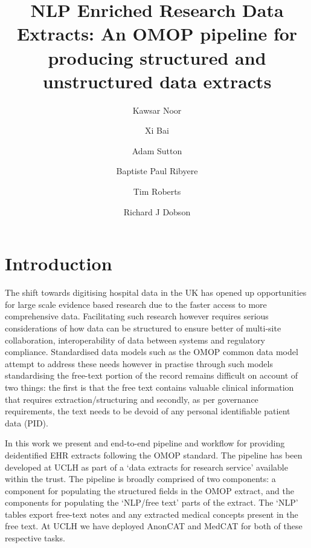 \documentclass[11pt]{article}
\title{NLP Enriched Research Data Extracts: An OMOP pipeline for producing structured and unstructured data extracts}
\begin{document}
\renewcommand\Authand{}

\author[1,3]{Kawsar Noor}
\author[1,3]{ Xi Bai}
\author[2]{Adam Sutton}
\author[3]{Baptiste Paul Ribyere}
\author[3]{Tim Roberts}
\author[1,2]{Richard J Dobson}


 
\date{}
\maketitle

\renewcommand{\absnamepos}{flushleft}
\setlength{\absleftindent}{0pt}
\setlength{\absrightindent}{0pt}

\section{Introduction}
The shift towards digitising hospital data in the UK has opened up opportunities for large scale evidence based research due to the faster access to more comprehensive data. Facilitating such research however requires serious considerations of how data can be structured to ensure better of multi-site collaboration, interoperability of data between systems and regulatory compliance. Standardised data models such as the OMOP common data model attempt to address these needs however in practise through such models standardising the free-text portion of the record remains difficult on account of two things: the first is that the free text contains valuable clinical information that requires extraction/structuring and secondly, as per governance requirements, the text needs to be devoid of any personal identifiable patient data (PID). 

In this work we present and end-to-end pipeline and workflow for providing deidentified EHR extracts following the OMOP standard. The pipeline has been developed at UCLH as part of a `data extracts for research service' available within the trust. The pipeline is broadly comprised of two components: a component for populating the structured fields in the OMOP extract, and the components for populating the `NLP/free text' parts of the extract. The `NLP' tables export free-text notes and any extracted medical concepts present in the free text. At UCLH we have deployed AnonCAT and MedCAT for both of these respective tasks. 
\end{document}
